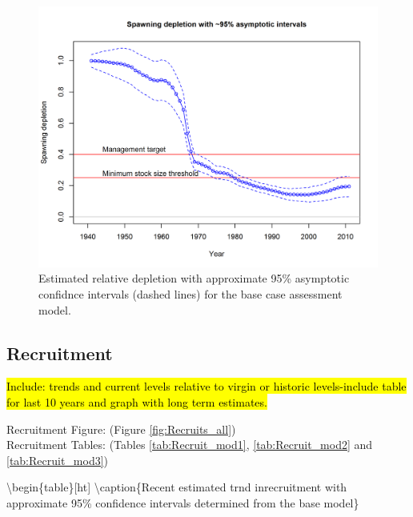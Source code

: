 \documentclass[12pt,]{article}
\begin{document}
\begin{figure}
\centering
\includegraphics{r4ss/plots_mod1/ts9_Spawning_depletion_with_95_asymptotic_intervals_intervals.png}
\caption{Estimated relative depletion with approximate 95\% asymptotic
confidnce intervals (dashed lines) for the base case assessment model.
\label{fig:RelDeplete_all}}
\end{figure}

\FloatBarrier

\subsection*{Recruitment}\label{recruitment}

\hl{Include: trends and current levels relative to virgin or historic levels-include 
table for last 10 years and graph with long term estimates.}

Recruitment Figure: (Figure \ref{fig:Recruits_all})\\
Recruitment Tables: (Tables \ref{tab:Recruit_mod1},
\ref{tab:Recruit_mod2} and \ref{tab:Recruit_mod3})

\textbackslash{}begin\{table\}{[}ht{]} \centering
\textbackslash{}caption\{Recent estimated trnd inrecruitment with
approximate 95\% confidence intervals determined from the base model\}
\label{tab:Recruit_mod1}
\end{document}
